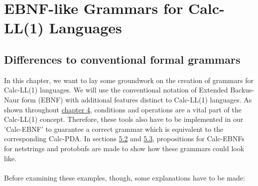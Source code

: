 \section{EBNF-like Grammars for Calc-LL(1) Languages}
\label{5.0}
\subsection{Differences to conventional formal grammars}
\label{5.1}
In this chapter, we want to lay some groundwork on the creation of grammars for Calc-LL(1) languages. We will use the conventional notation of Extended Backus-Naur form (EBNF) \cite{EBNF} with additional features distinct to Calc-LL(1) languages. As shown throughout \hyperref[4.0]{chapter 4}, conditions and operations are a vital part of the Calc-LL(1) concept. Therefore, these tools also have to be implemented in our 'Calc-EBNF' to guarantee a correct grammar which is equivalent to the corresponding Calc-PDA. In sections \hyperref[5.2]{5.2} and \hyperref[5.3]{5.3}, propositions for Calc-EBNFs for netstrings and protobufs are made to show how these grammars could look like.\\\\
Before examining these examples, though, some explanations have to be made:
